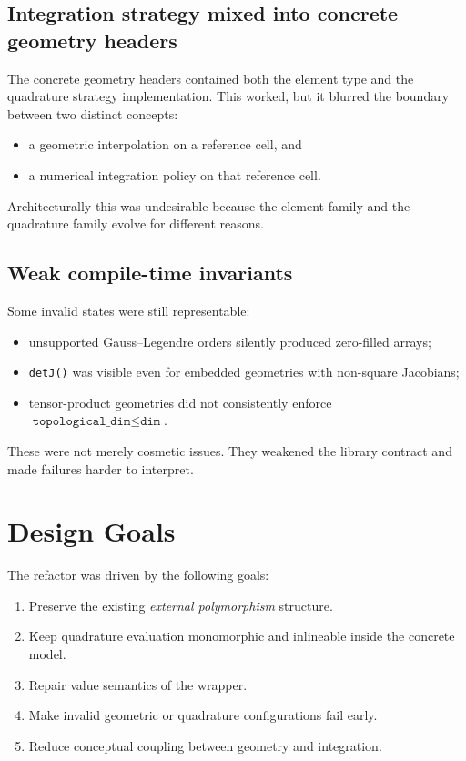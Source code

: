 \subsection{Integration strategy mixed into concrete geometry headers}

The concrete geometry headers contained both the element type and the
quadrature strategy implementation.  This worked, but it blurred the boundary
between two distinct concepts:

\begin{itemize}[nosep]
  \item a geometric interpolation on a reference cell, and
  \item a numerical integration policy on that reference cell.
\end{itemize}

Architecturally this was undesirable because the element family and the
quadrature family evolve for different reasons.

\subsection{Weak compile-time invariants}

Some invalid states were still representable:

\begin{itemize}[nosep]
  \item unsupported Gauss--Legendre orders silently produced zero-filled arrays;
  \item \texttt{detJ()} was visible even for embedded geometries with
        non-square Jacobians;
  \item tensor-product geometries did not consistently enforce
        \(\texttt{topological\_dim} \le \texttt{dim}\).
\end{itemize}

These were not merely cosmetic issues.  They weakened the library contract and
made failures harder to interpret.


\section{Design Goals}
\label{sec:eg_design_goals}

The refactor was driven by the following goals:

\begin{enumerate}[nosep]
  \item Preserve the existing \emph{external polymorphism} structure.
  \item Keep quadrature evaluation monomorphic and inlineable inside the
        concrete model.
  \item Repair value semantics of the wrapper.
  \item Make invalid geometric or quadrature configurations fail early.
  \item Reduce conceptual coupling between geometry and integration.
\end{enumerate}

